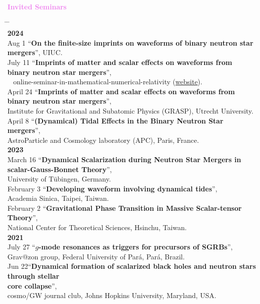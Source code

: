 \documentclass[10pt,floatfix,a4paper]{article}
\begin{document}
{\large \bf \textcolor{Violet}{Invited Seminars}}
\begin{tabbing}
  \hspace*{5mm} \= \hspace*{2cm} \= \hspace*{10cm} \\[-3ex]
  \> {\bf 2024} \> \\[1ex]
  \> Aug 1 \> ``\textbf{On the finite-size imprints on waveforms of binary neutron star mergers}'', UIUC. \\  
  \> July 11 \> ``\textbf{Imprints of matter and scalar effects on waveforms from binary neutron star mergers}'',\\\
  \> \> online-seminar-in-mathematical-numerical-relativity (\href{https://github.com/Mathematical-Numerical-Relativity/Online-Seminar/wiki}{website}). \\
  \> April 24 \> ``\textbf{Imprints of matter and scalar effects on waveforms from binary neutron star mergers}'',\\
  \> \>  Institute for Gravitational and Subatomic Physics (GRASP), Utrecht University.\\
  \> April 8 \> ``\textbf{(Dynamical) Tidal Effects in the Binary Neutron Star mergers}'',\\
  \> \> AstroParticle and Cosmology laboratory (APC), Paris, France. \\
  \> {\bf 2023} \> \\[1ex]
  \> March 16 \> ``\textbf{Dynamical Scalarization during Neutron Star Mergers in scalar-Gauss-Bonnet Theory}'', \\
  \> \> University of T{\"u}bingen, Germany.\\
  \> February 3 \> ``\textbf{Developing waveform involving dynamical tides}'', \\
  \> \> Academia Sinica, Taipei, Taiwan.\\
  \> February 2 \> ``\textbf{Gravitational Phase Transition in
  Massive Scalar-tensor Theory}'', \\
  \> \> National Center for Theoretical Sciences, Hsinchu, Taiwan.\\
  \> {\bf 2021} \> \\[1ex]
  \> July 27 \>``\textbf{$g$-mode resonances as triggers for precursors of SGRBs}'', \\ 
  \> \> Grav@zon group, Federal University of Pará, Pará, Brazil. \\
  \> Jun 22\>``\textbf{Dynamical formation of scalarized black holes and neutron stars through stellar}\\
  \> \> \textbf{core collapse}'', \\ 
  \> \> cosmo/GW journal club, Johns Hopkins University, Maryland, USA.
\end{tabbing}
\end{document}
